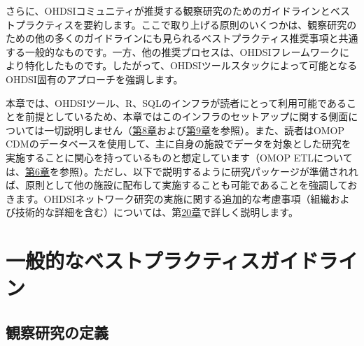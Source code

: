\documentclass[
  11pt]{book}
\theoremstyle{definition}
\theoremstyle{definition}
\theoremstyle{definition}
\theoremstyle{definition}
\theoremstyle{remark}
\begin{document}
さらに、OHDSIコミュニティが推奨する観察研究のためのガイドラインとベストプラクティスを要約します。ここで取り上げる原則のいくつかは、観察研究のための他の多くのガイドラインにも見られるベストプラクティス推奨事項と共通する一般的なものです。一方、他の推奨プロセスは、OHDSIフレームワークにより特化したものです。したがって、OHDSIツールスタックによって可能となるOHDSI固有のアプローチを強調します。

本章では、OHDSIツール、R、SQLのインフラが読者にとって利用可能であることを前提としているため、本章ではこのインフラのセットアップに関する側面については一切説明しません（\href{https://ohdsi.github.io/TheBookOfOhdsi/OhdsiAnalyticsTools.html\#OhdsiAnalyticsTools}{第8章}および\href{https://ohdsi.github.io/TheBookOfOhdsi/SqlAndR.html\#SqlAndR}{第9章}を参照）。また、読者はOMOP CDMのデータベースを使用して、主に自身の施設でデータを対象とした研究を実施することに関心を持っているものと想定しています（OMOP ETLについては、\href{https://ohdsi.github.io/TheBookOfOhdsi/ExtractTransformLoad.html\#ExtractTransformLoad}{第6章}を参照）。ただし、以下で説明するように研究パッケージが準備されれば、原則として他の施設に配布して実施することも可能であることを強調しておきます。OHDSIネットワーク研究の実施に関する追加的な考慮事項（組織および技術的な詳細を含む）については、第\href{https://ohdsi.github.io/TheBookOfOhdsi/NetworkResearch.html\#NetworkResearch}{20章}で詳しく説明します。

\section{一般的なベストプラクティスガイドライン}\label{ux4e00ux822cux7684ux306aux30d9ux30b9ux30c8ux30d7ux30e9ux30afux30c6ux30a3ux30b9ux30acux30a4ux30c9ux30e9ux30a4ux30f3}

\subsection{観察研究の定義}\label{ux89b3ux5bdfux7814ux7a76ux306eux5b9aux7fa9}
\end{document}
